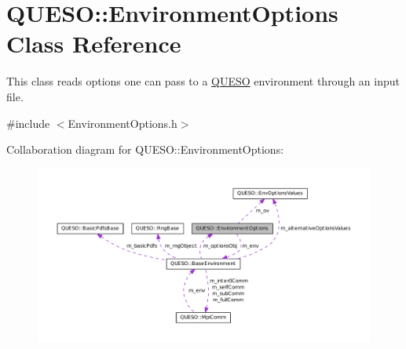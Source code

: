 \hypertarget{class_q_u_e_s_o_1_1_environment_options}{\section{Q\-U\-E\-S\-O\-:\-:Environment\-Options Class Reference}
\label{class_q_u_e_s_o_1_1_environment_options}
}


This class reads options one can pass to a \hyperlink{namespace_q_u_e_s_o}{Q\-U\-E\-S\-O} environment through an input file.  




{\ttfamily \#include $<$Environment\-Options.\-h$>$}



Collaboration diagram for Q\-U\-E\-S\-O\-:\-:Environment\-Options\-:
\nopagebreak
\begin{figure}[H]
\begin{center}
\leavevmode
\includegraphics[width=350pt]{class_q_u_e_s_o_1_1_environment_options__coll__graph}
\end{center}
\end{figure}
